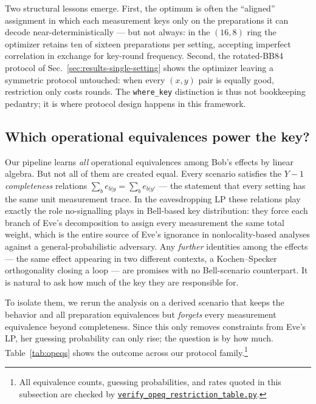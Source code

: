 \documentclass[aps,pra,twocolumn,superscriptaddress,longbibliography,nofootinbib]{revtex4-2}
\newcommand{\wherekey}{\texttt{where\_key}}
\newcommand{\repoBase}{https://github.com/eliewolfe/RandomnessWinterSchool2026/blob/main/paper/scripts}
\newcommand{\repoScript}[1]{\href{\repoBase/#1}{\texttt{#1}}}
\begin{document}
Two structural lessons emerge. First, the optimum is often the
``aligned'' assignment in which each measurement keys only on the
preparations it can decode near-deterministically --- but not always:
in the $(16,8)$ ring the optimizer retains ten of sixteen preparations
per setting, accepting imperfect correlation in exchange for key-round
frequency. Second, the rotated-BB84 protocol of
Sec.~\ref{sec:results-single-setting} shows the optimizer leaving a
symmetric protocol untouched: when every $(x,y)$ pair is equally good,
restriction only costs rounds. The \wherekey{} distinction is thus not
bookkeeping pedantry; it is where protocol design happens in this
framework.

\subsection{Which operational equivalences power the key?}
\label{sec:results-opeqs}

Our pipeline learns \emph{all} operational equivalences among Bob's
effects by linear algebra. But not all of them are created equal. Every
scenario satisfies the $Y{-}1$ \emph{completeness} relations
$\sum_{b}e_{b|y}=\sum_{b}e_{b|y'}$ --- the statement that every setting
has the same unit measurement trace. In the eavesdropping LP these
relations play exactly the role no-signalling plays in Bell-based key
distribution: they force each branch of Eve's decomposition to assign
every measurement the same total weight, which is the entire source of
Eve's ignorance in nonlocality-based analyses against a
general-probabilistic adversary. Any \emph{further} identities among
the effects --- the same effect appearing in two different contexts, a
Kochen--Specker orthogonality closing a loop --- are promises with no
Bell-scenario counterpart. It is natural to ask how much of the key
they are responsible for.

To isolate them, we rerun the analysis on a derived scenario that keeps
the behavior and all preparation equivalences but \emph{forgets} every
measurement equivalence beyond completeness. Since this only removes
constraints from Eve's LP, her guessing probability can only rise;
the question is by how much. Table~\ref{tab:opeqs} shows the outcome
across our protocol family.\footnote{All equivalence counts, guessing
probabilities, and rates quoted in this subsection are checked by
\repoScript{verify\_opeq\_restriction\_table.py}.}
\end{document}
